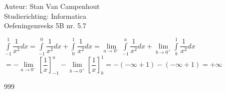 \documentclass[a4paper]{article}
\begin{document}
  
\noindent \large Auteur: Stan Van Campenhout \\
\noindent \large Studierichting:  Informatica\\
\noindent \large Oefeningenreeks 5B nr. 5.7\\

\medskip

\normalsize

$ \displaystyle\int\limits_{-1}^1\dfrac{1}{x^2}dx = \displaystyle\int\limits_{-1}^0\dfrac{1}{x^2}dx + \displaystyle\int\limits_0^1\dfrac{1}{x^2}dx
= \lim\limits_{a\rightarrow0^-}\displaystyle\int\limits_{-1}^a\dfrac{1}{x^2}dx + \lim\limits_{b\rightarrow0^+} \displaystyle\int\limits_b^1\dfrac{1}{x^2}dx $\\

$ = -\lim\limits_{a\rightarrow0^-}\left[\dfrac{1}{x}\right]_{-1}^a-\lim\limits_{b\rightarrow0^+}\left[\dfrac{1}{x}\right]_b^1 
= -\left(-\infty+1\right)-\left(-\infty+1\right) = +\infty $\\


\begin{thebibliography}{999}
\end{thebibliography}
\end{document}
